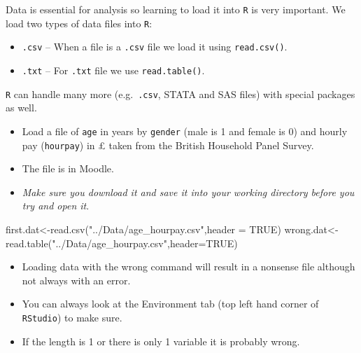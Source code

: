 \documentclass[
]{gitbook}
\newenvironment{Shaded}{\begin{snugshade}}{\end{snugshade}}
\newcommand{\AttributeTok}[1]{\textcolor[rgb]{0.77,0.63,0.00}{#1}}
\newcommand{\ConstantTok}[1]{\textcolor[rgb]{0.00,0.00,0.00}{#1}}
\newcommand{\FunctionTok}[1]{\textcolor[rgb]{0.00,0.00,0.00}{#1}}
\newcommand{\NormalTok}[1]{#1}
\newcommand{\OtherTok}[1]{\textcolor[rgb]{0.56,0.35,0.01}{#1}}
\newcommand{\StringTok}[1]{\textcolor[rgb]{0.31,0.60,0.02}{#1}}
\providecommand{\tightlist}{%
  \setlength{\itemsep}{0pt}\setlength{\parskip}{0pt}}
\begin{document}
Data is essential for analysis so learning to load it into \texttt{R} is very important. We load two types of data files into \texttt{R}:

\begin{itemize}
\tightlist
\item
  \texttt{.csv} -- When a file is a \texttt{.csv} file we load it using \texttt{read.csv()}.
\item
  \texttt{.txt} -- For \texttt{.txt} file we use \texttt{read.table()}.
\end{itemize}

\texttt{R} can handle many more (e.g.~\texttt{.csv}, STATA and SAS files) with special packages as well.

\begin{itemize}
\tightlist
\item
  Load a file of \texttt{age} in years by \texttt{gender} (male is 1 and female is 0) and hourly pay (\texttt{hourpay}) in £ taken from the British Household Panel Survey.
\item
  The file is in Moodle.
\item
  \emph{Make sure you download it and save it into your working directory before you try and open it}.
\end{itemize}

\begin{Shaded}
\begin{Highlighting}[]
\NormalTok{first.dat}\OtherTok{\textless{}{-}}\FunctionTok{read.csv}\NormalTok{(}\StringTok{"../Data/age\_hourpay.csv"}\NormalTok{,}\AttributeTok{header =} \ConstantTok{TRUE}\NormalTok{)}
\NormalTok{wrong.dat}\OtherTok{\textless{}{-}}\FunctionTok{read.table}\NormalTok{(}\StringTok{"../Data/age\_hourpay.csv"}\NormalTok{,}\AttributeTok{header=}\ConstantTok{TRUE}\NormalTok{)}
\end{Highlighting}
\end{Shaded}

\begin{itemize}
\tightlist
\item
  Loading data with the wrong command will result in a nonsense file although not always with an error.
\item
  You can always look at the Environment tab (top left hand corner of \texttt{RStudio}) to make sure.
\item
  If the length is 1 or there is only 1 variable it is probably wrong.
\end{itemize}

\small
\end{document}
